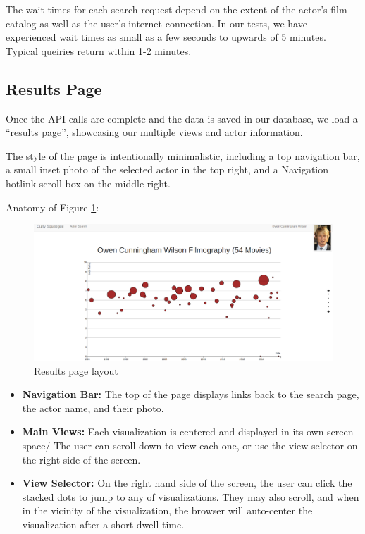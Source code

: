 \documentclass[12pt]{article}
\begin{document}
The wait times for each search request depend on the extent of the actor's film catalog as well as the user's internet connection.  In our tests, we have experienced wait times as small as a few seconds to upwards of 5 minutes. Typical queiries return within 1-2 minutes.


\subsection{Results Page}

Once the API calls are complete and the data is saved in our database, we load a ``results page'',   showcasing our multiple views and actor information. 

The style of the page is intentionally minimalistic, including a top navigation bar, a small inset photo of the selected actor in the top right, and a Navigation hotlink scroll box on the middle right.

Anatomy of Figure \ref{fig:resultsPage}:


\begin{figure}
	\centering
	\includegraphics[width = \textwidth]{images/resultsPage.png}
	\caption{Results page layout}\label{fig:resultsPage}
\end{figure}


\begin{itemize}
	\item \textbf{Navigation Bar:}  The top of the page displays links back to the search page, the actor name, and their photo.
	\item \textbf{Main Views:} Each visualization is centered and displayed in its own screen space/ The user can scroll down to view each one, or use the view selector on the right side of the screen. 
	\item \textbf{View Selector:} On the right hand side of the screen, the user can click the stacked dots to jump to any of visualizations.  They may also scroll, and when in the vicinity of the visualization, the browser will auto-center the visualization after a short dwell time.
\end{itemize}
\end{document}
